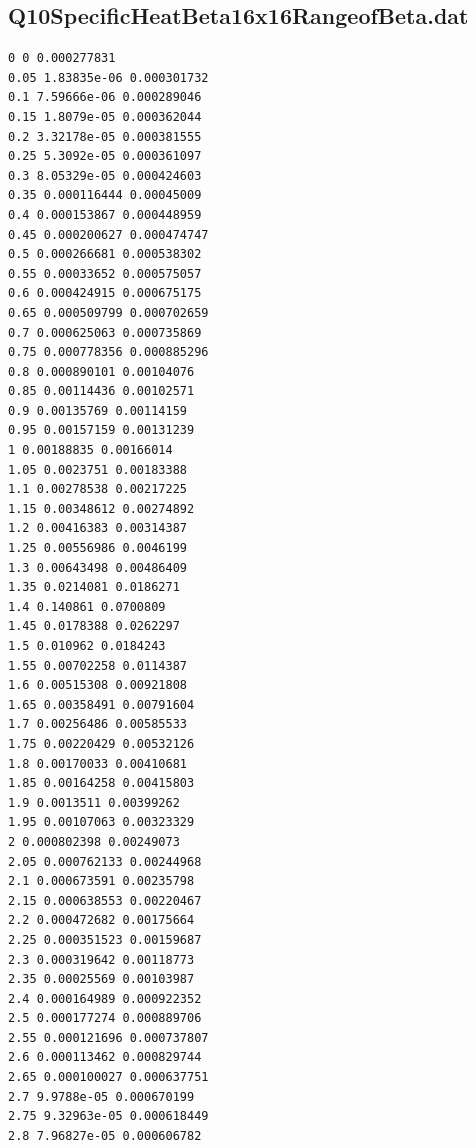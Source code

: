 \subsection{Q10SpecificHeatBeta16x16RangeofBeta.dat}
\begin{lstlisting}
0 0 0.000277831
0.05 1.83835e-06 0.000301732
0.1 7.59666e-06 0.000289046
0.15 1.8079e-05 0.000362044
0.2 3.32178e-05 0.000381555
0.25 5.3092e-05 0.000361097
0.3 8.05329e-05 0.000424603
0.35 0.000116444 0.00045009
0.4 0.000153867 0.000448959
0.45 0.000200627 0.000474747
0.5 0.000266681 0.000538302
0.55 0.00033652 0.000575057
0.6 0.000424915 0.000675175
0.65 0.000509799 0.000702659
0.7 0.000625063 0.000735869
0.75 0.000778356 0.000885296
0.8 0.000890101 0.00104076
0.85 0.00114436 0.00102571
0.9 0.00135769 0.00114159
0.95 0.00157159 0.00131239
1 0.00188835 0.00166014
1.05 0.0023751 0.00183388
1.1 0.00278538 0.00217225
1.15 0.00348612 0.00274892
1.2 0.00416383 0.00314387
1.25 0.00556986 0.0046199
1.3 0.00643498 0.00486409
1.35 0.0214081 0.0186271
1.4 0.140861 0.0700809
1.45 0.0178388 0.0262297
1.5 0.010962 0.0184243
1.55 0.00702258 0.0114387
1.6 0.00515308 0.00921808
1.65 0.00358491 0.00791604
1.7 0.00256486 0.00585533
1.75 0.00220429 0.00532126
1.8 0.00170033 0.00410681
1.85 0.00164258 0.00415803
1.9 0.0013511 0.00399262
1.95 0.00107063 0.00323329
2 0.000802398 0.00249073
2.05 0.000762133 0.00244968
2.1 0.000673591 0.00235798
2.15 0.000638553 0.00220467
2.2 0.000472682 0.00175664
2.25 0.000351523 0.00159687
2.3 0.000319642 0.00118773
2.35 0.00025569 0.00103987
2.4 0.000164989 0.000922352
2.5 0.000177274 0.000889706
2.55 0.000121696 0.000737807
2.6 0.000113462 0.000829744
2.65 0.000100027 0.000637751
2.7 9.9788e-05 0.000670199
2.75 9.32963e-05 0.000618449
2.8 7.96827e-05 0.000606782
\end{lstlisting}

